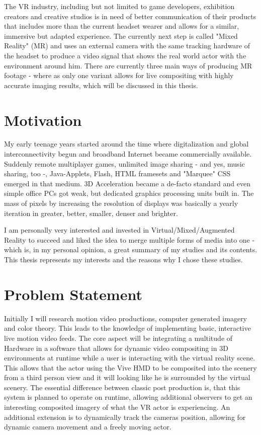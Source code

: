 The VR industry, including but not limited to game developers, exhibition 
creators and creative studios is in need of better communication of their 
products that includes more than the current headset wearer and allows for a 
similar, immersive but adapted experience.
\newline
The currently next step is called "Mixed Reality" (MR) and uses an external 
camera with the same tracking hardware of the headset to produce a video signal 
that shows the real world actor with the environment around him. There are 
currently three main ways of producing MR footage - where as only one variant 
allows for live compositing with highly accurate imaging results, which will be 
discussed in this thesis.

\section{Motivation}
\label{sec:intro:motivation}

My early teenage years started around the time where digitalization and global
interconnectivity begun and broadband Internet became commercially available.
Suddenly remote multiplayer games, unlimited image sharing - and yes, music
sharing, too -, Java-Applets, Flash, HTML framesets and "Marquee" CSS emerged in
that medium. 3D Acceleration became a de-facto standard and even simple office
PCs got weak, but dedicated graphics processing units built in. The mass of
pixels by increasing the resolution of displays was basically a yearly
iteration in greater, better, smaller, denser and brighter.

I am personally very interested and invested in Virtual/Mixed/Augmented Reality 
to succeed and liked the idea to merge multiple forms of media into one - which 
is, in my personal opinion, a great summary of my studies and its contents. 
This thesis represents my interests and the reasons why I chose these studies.

\section{Problem Statement}
\label{sec:intro:problem}

Initially I will research motion video productions, computer generated imagery 
and color theory. This leads to the knowledge of implementing basic, 
interactive live motion video feeds.
\newline
The core aspect will be integrating a multitude of Hardware in a software that 
allows for dynamic video compositing in 3D environments at runtime while a user 
is interacting with the virtual reality scene. This allows that the actor 
using the Vive HMD to be composited into the scenery from a third person view 
and it will looking like he is surrounded by the virtual scenery. The essential 
difference between classic post production is, that this system is planned to 
operate on runtime, allowing additional observers to get an interesting 
composited imagery of what the VR actor is experiencing.
\newline
An additional extension is to dynamically track the cameras position, allowing 
for dynamic camera movement and a freely moving actor. 

